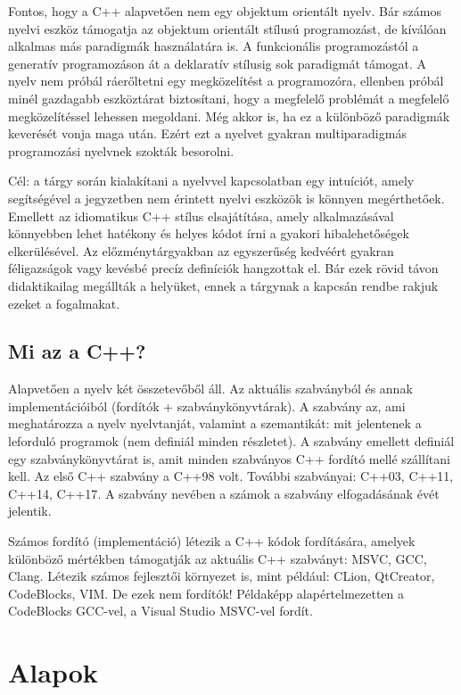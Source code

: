\documentclass[../cpp_book/cpp_book.tex]{subfiles}
\begin{document}
	Fontos, hogy a C++ alapvetően nem egy objektum orientált nyelv. Bár számos nyelvi eszköz támogatja az objektum orientált stílusú programozást, de kíválóan alkalmas más paradigmák használatára is. A funkcionális programozástól a generatív programozáson át a deklaratív stílusig sok paradigmát támogat. A nyelv nem próbál ráerőltetni egy megközelítést a programozóra, ellenben próbál minél gazdagabb eszköztárat biztosítani, hogy a megfelelő problémát a megfelelő megközelítéssel lehessen megoldani. Még akkor is, ha ez a különböző paradigmák keverését vonja maga után. Ezért ezt a nyelvet gyakran multiparadigmás programozási nyelvnek szokták besorolni. 

	\medskip
	Cél: a tárgy során kialakítani a nyelvvel kapcsolatban egy intuíciót, amely segítségével a jegyzetben nem érintett nyelvi eszközök is könnyen megérthetőek. Emellett az idiomatikus C++ stílus elsajátítása, amely alkalmazásával könnyebben lehet hatékony és helyes kódot írni a gyakori hibalehetőségek elkerülésével. Az előzménytárgyakban az egyszerűség kedvéért gyakran féligazságok vagy kevésbé precíz definíciók hangzottak el. Bár ezek rövid távon didaktikailag megállták a helyüket, ennek a tárgynak a kapcsán rendbe rakjuk ezeket a fogalmakat.

	\subsection{Mi az a C++?}
	Alapvetően a nyelv két összetevőből áll. Az aktuális szabványból és annak implementációiból (fordítók + szabványkönyvtárak). A szabvány az, ami meghatározza a nyelv nyelvtanját, valamint a szemantikát: mit jelentenek a leforduló programok (nem definiál minden részletet). A szabvány emellett definiál egy szabványkönyvtárat is, amit minden szabványos C++ fordító mellé szállítani kell. Az első C++ szabvány a {C++98} volt. További szabványai: {C++03}, {C++11}, {C++14}, {C++17}. A szabvány nevében a számok a szabvány elfogadásának évét jelentik. 
	
	\medskip
	Számos fordító (implementáció) létezik a C++ kódok fordítására, amelyek különböző mértékben támogatják az aktuális C++ szabványt: MSVC, GCC, Clang.
	Létezik számos fejlesztői környezet is, mint például: CLion, QtCreator, CodeBlocks, VIM. De ezek nem fordítók! Példaképp alapértelmezetten a CodeBlocks GCC-vel, a Visual Studio MSVC-vel fordít.


	\section{Alapok}
\end{document}
